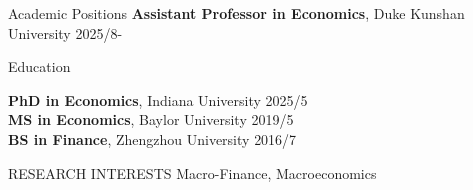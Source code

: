 \documentclass{resume} %
\begin{document}

\begin{rSection}{Academic Positions}
{\bf Assistant Professor in Economics}, Duke Kunshan University \hfill {2025/8-}
\end{rSection}


\begin{rSection}{Education}

{\bf PhD in Economics}, Indiana University \hfill {2025/5}\\
{\bf MS in Economics}, Baylor University \hfill {2019/5}\\
{\bf BS in Finance}, Zhengzhou University \hfill {2016/7}


\end{rSection}



\begin{rSection}{RESEARCH INTERESTS}
Macro-Finance, Macroeconomics
\end{rSection}
 
\end{document}
